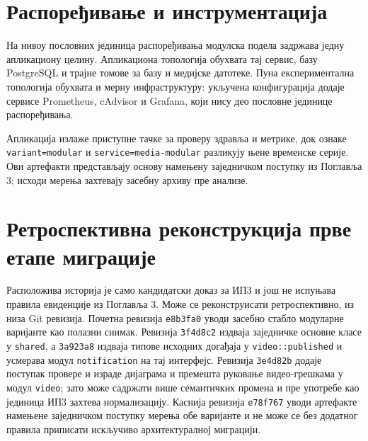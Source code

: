 \documentclass[12pt,oneside]{memoir}
\begin{document}

\section{Распоређивање и инструментација}

На нивоу пословних јединица распоређивања модулска подела задржава једну
апликациону целину. Апликациона топологија обухвата тај сервис, базу
{\lat PostgreSQL} и трајне томове за базу и медијске датотеке. Пуна
експериментална топологија обухвата и мерну инфраструктуру: укључена
конфигурација додаје сервисе {\lat Prometheus}, {\lat cAdvisor} и
{\lat Grafana}, који нису део пословне јединице распоређивања.

Апликација излаже приступне тачке за проверу здравља и метрике, док ознаке
\texttt{variant=modular} и \texttt{service=media-modular} разликују њене
временске серије. Ови артефакти представљају основу намењену заједничком
поступку из Поглавља 3; исходи мерења захтевају засебну архиву пре анализе.


\section{Ретроспективна реконструкција прве етапе миграције}

Расположива историја је само кандидатски доказ за ИП3 и још не испуњава
правила евиденције из Поглавља 3. Може се реконструисати ретроспективно, из
низа {\lat Git} ревизија. Почетна ревизија \texttt{e8b3fa0} уводи засебно
стабло модуларне варијанте као полазни снимак. Ревизија \texttt{3f4d8c2}
издваја заједничке основне класе у \texttt{shared}, а \texttt{3a923a8}
издваја типове исходних догађаја у \texttt{video::published} и усмерава модул
\texttt{notifi\allowbreak cation} на тај интерфејс. Ревизија \texttt{3e4d82b} додаје
поступак провере и израде дијаграма и премешта руковање видео-грешкама у модул
\texttt{video}; зато може садржати више семантичких промена и пре употребе као
јединица ИП3 захтева нормализацију. Каснија ревизија \texttt{e78f767} уводи
артефакте намењене заједничком поступку мерења обе варијанте и не може се без
додатног правила приписати искључиво архитектуралној миграцији.
\end{document}
